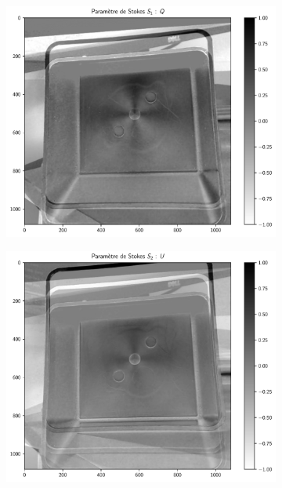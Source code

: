 \begin{figure}[tbph]
\begin{subfigure}[r]{0.495\textwidth}
	\end{subfigure}
	\vspace{1cm}
	\\
	\begin{subfigure}[l]{0.495\textwidth}
		\includegraphics[width=\textwidth]{../Chap2/Figures/img_stokesQ.pdf}
	\end{subfigure}
	\begin{subfigure}[r]{0.495\textwidth}
		\includegraphics[width=\textwidth]{../Chap2/Figures/img_stokesU.pdf}

\end{subfigure}
\end{figure}
